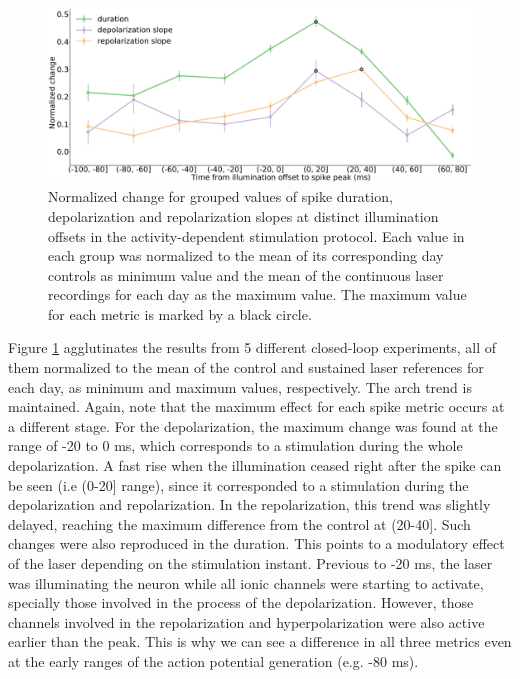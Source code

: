 \begin{figure}[htb!]
	\includegraphics[width=\textwidth]{img/laser/Figure7.pdf}
	\caption{Normalized change for grouped values of spike duration, depolarization and repolarization slopes at distinct illumination offsets in the activity-dependent stimulation protocol. Each value in each group was normalized to the mean of its corresponding day controls as minimum value and the mean of the continuous laser recordings for each day as the maximum value. The maximum value for each metric is marked by a black circle. }
	\label{fig:activity dependent error mean }
\end{figure}

Figure \ref{fig:activity dependent error mean } agglutinates the results from 5 different closed-loop experiments, all of them normalized to the mean of the control and sustained laser references for each day, as minimum and maximum values, respectively. The arch trend is maintained. Again, note that the maximum effect for each spike metric occurs at a different stage. For the depolarization, the maximum change was found at the range of -20 to 0 ms, which corresponds to a stimulation during the whole depolarization. A fast rise when the illumination ceased right after the spike can be seen (i.e (0-20] range), since it corresponded to a stimulation during the depolarization and repolarization. In the repolarization, this trend was slightly delayed, reaching the maximum difference from the control at (20-40]. Such changes were also reproduced in the duration. This points to a modulatory effect of the laser depending on the stimulation instant. Previous to -20 ms, the laser was illuminating the neuron while all ionic channels were starting to activate, specially those involved in the process of the depolarization. However, those channels involved in the repolarization and hyperpolarization were also active earlier than the peak. This is why we can see a difference in all three metrics even at the early ranges of the action potential generation (e.g. -80 ms).

